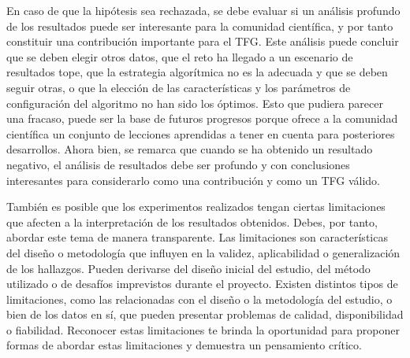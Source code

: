 En caso de que la hipótesis sea rechazada, se debe evaluar si un análisis profundo de los resultados puede ser interesante para la comunidad científica, y por tanto constituir una contribución importante para el TFG. Este análisis puede concluir que se deben elegir otros datos, que el reto ha llegado a un escenario de resultados tope, que la estrategia algorítmica no es la adecuada y que se deben seguir otras, o que la elección de las características y los parámetros de configuración del algoritmo no han sido los óptimos. Esto que pudiera parecer una fracaso, puede ser la base de futuros progresos porque ofrece a la comunidad científica un conjunto de lecciones aprendidas a tener en cuenta para posteriores desarrollos. Ahora bien, se remarca que cuando se ha obtenido un resultado negativo, el análisis de resultados debe ser profundo y con conclusiones interesantes para considerarlo como una contribución y como un TFG válido.

También es posible que los experimentos realizados tengan ciertas limitaciones que afecten a la interpretación de los resultados obtenidos. Debes, por tanto, abordar este tema de manera transparente. Las limitaciones son características del diseño o metodología que influyen en la validez, aplicabilidad o generalización de los hallazgos. Pueden derivarse del diseño inicial del estudio, del método utilizado o de desafíos imprevistos durante el proyecto. Existen distintos tipos de limitaciones, como las relacionadas con el diseño o la metodología del estudio, o bien de los datos en sí, que pueden presentar problemas de calidad, disponibilidad o fiabilidad. Reconocer estas limitaciones te brinda la oportunidad para proponer formas de abordar estas limitaciones y demuestra un pensamiento crítico.

